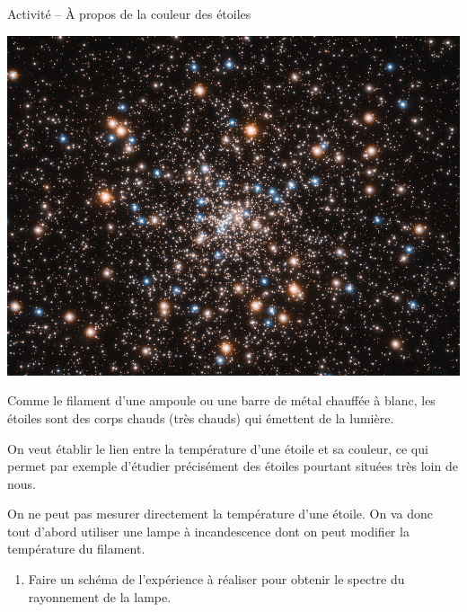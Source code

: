 \documentclass[12pt,a4paper,fleqn]{article}
\begin{document}
\begin{header}
Activité -- À propos de la couleur des étoiles
\end{header}

\begin{multicols}{2}
\begin{center}
\includegraphics[trim=0 100 0 100, clip, width=\linewidth]{images/hubble_globular_cluster.png}
\end{center}

Comme le filament d'une ampoule ou une barre de métal chauffée à blanc, les étoiles sont des corps chauds (très chauds) qui émettent de la lumière.

On veut établir le lien entre la température d'une étoile et sa couleur, ce qui permet par exemple d'étudier précisément des étoiles pourtant situées très loin de nous.
\end{multicols}

On ne peut pas mesurer directement la température d'une étoile.
On va donc tout d'abord utiliser une lampe à incandescence dont on peut modifier la température du filament. 

\begin{enumerate}
\item \rea{}

Faire un schéma de l'expérience à réaliser pour obtenir le spectre du rayonnement de la lampe.

\vspace{100pt}
\end{enumerate}

\begin{appel}
\rea{}
\end{appel}
\end{document}
